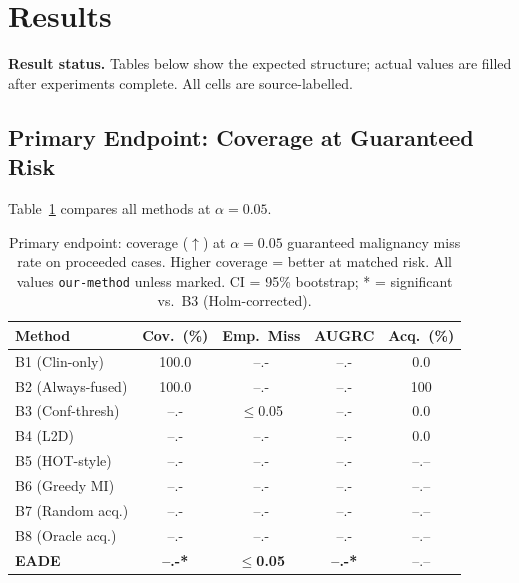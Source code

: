 \documentclass[conference]{IEEEtran}
\newcommand{\1}{\mathbf{1}}
\begin{document}
\section{Results}
\label{sec:results}

\noindent\textbf{Result status.} Tables below show the expected structure;
actual values are filled after experiments complete. All cells are
source-labelled.

\subsection{Primary Endpoint: Coverage at Guaranteed Risk}

Table~\ref{tab:primary} compares all methods at $\alpha=0.05$.

\begin{table}[H]
  \centering
  \caption{%
    Primary endpoint: coverage ($\uparrow$) at $\alpha=0.05$ guaranteed
    malignancy miss rate on proceeded cases. Higher coverage = better at
    matched risk. All values \texttt{our-method} unless marked.
    CI = 95\% bootstrap; * = significant vs.\ B3 (Holm-corrected).
  }
  \label{tab:primary}
  \renewcommand{\arraystretch}{1.2}
  \small
  \begin{tabular}{lcccc}
    \toprule
    \textbf{Method}
      & \textbf{Cov.~(\%)}
      & \textbf{Emp.\ Miss}
      & \textbf{AUGRC}
      & \textbf{Acq.~(\%)} \\
    \midrule
    B1 (Clin-only)   & 100.0 & --.-  & --.- & 0.0  \\
    B2 (Always-fused)& 100.0 & --.-  & --.- & 100  \\
    B3 (Conf-thresh) & --.-  & $\leq$0.05& --.- & 0.0  \\
    B4 (L2D)         & --.-  & --.-  & --.- & 0.0  \\
    B5 (HOT-style)   & --.-  & --.-  & --.- & --.--\\
    B6 (Greedy MI)   & --.-  & --.-  & --.- & --.--\\
    B7 (Random acq.) & --.-  & --.-  & --.- & --.--\\
    B8 (Oracle acq.) & --.-  & --.-  & --.- & --.--\\
    \rowcolor{bestrow}
    \textbf{EADE}    & \textbf{--.-*}& $\leq$\textbf{0.05}& \textbf{--.-*}& --.--\\
    \bottomrule
  \end{tabular}
\end{table}
\end{document}
